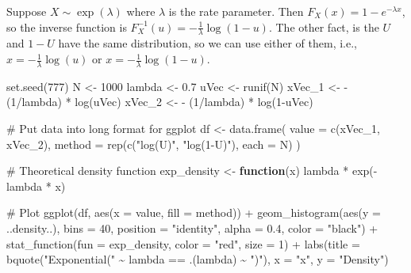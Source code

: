 \documentclass[
  letterpaper,
  DIV=11,
  numbers=noendperiod]{scrreprt}
\newenvironment{Shaded}{\begin{snugshade}}{\end{snugshade}}
\newcommand{\AttributeTok}[1]{\textcolor[rgb]{0.40,0.45,0.13}{#1}}
\newcommand{\CommentTok}[1]{\textcolor[rgb]{0.37,0.37,0.37}{#1}}
\newcommand{\ControlFlowTok}[1]{\textcolor[rgb]{0.00,0.23,0.31}{\textbf{#1}}}
\newcommand{\DecValTok}[1]{\textcolor[rgb]{0.68,0.00,0.00}{#1}}
\newcommand{\FloatTok}[1]{\textcolor[rgb]{0.68,0.00,0.00}{#1}}
\newcommand{\FunctionTok}[1]{\textcolor[rgb]{0.28,0.35,0.67}{#1}}
\newcommand{\NormalTok}[1]{\textcolor[rgb]{0.00,0.23,0.31}{#1}}
\newcommand{\OtherTok}[1]{\textcolor[rgb]{0.00,0.23,0.31}{#1}}
\newcommand{\SpecialCharTok}[1]{\textcolor[rgb]{0.37,0.37,0.37}{#1}}
\newcommand{\StringTok}[1]{\textcolor[rgb]{0.13,0.47,0.30}{#1}}
\begin{document}
Suppose \(X\sim \exp(\lambda)\) where \(\lambda\) is the rate parameter.
Then \(F_X(x) = 1 - e^{-\lambda x}\), so the inverse function is
\(F_X^{-1}(u) = -\frac{1}{\lambda}\log(1-u)\). The other fact, is the
\(U\) and \(1-U\) have the same distribution, so we can use either of
them, i.e., \(x= -\frac{1}{\lambda}\log(u)\) or
\(x= -\frac{1}{\lambda}\log(1-u)\).

\begin{Shaded}
\begin{Highlighting}[]
\FunctionTok{set.seed}\NormalTok{(}\DecValTok{777}\NormalTok{)}
\NormalTok{N }\OtherTok{\textless{}{-}} \DecValTok{1000}
\NormalTok{lambda }\OtherTok{\textless{}{-}} \FloatTok{0.7}
\NormalTok{uVec }\OtherTok{\textless{}{-}} \FunctionTok{runif}\NormalTok{(N)}
\NormalTok{xVec\_1 }\OtherTok{\textless{}{-}} \SpecialCharTok{{-}}\NormalTok{ (}\DecValTok{1}\SpecialCharTok{/}\NormalTok{lambda) }\SpecialCharTok{*} \FunctionTok{log}\NormalTok{(uVec)}
\NormalTok{xVec\_2 }\OtherTok{\textless{}{-}} \SpecialCharTok{{-}}\NormalTok{ (}\DecValTok{1}\SpecialCharTok{/}\NormalTok{lambda) }\SpecialCharTok{*} \FunctionTok{log}\NormalTok{(}\DecValTok{1}\SpecialCharTok{{-}}\NormalTok{uVec)}

\CommentTok{\# Put data into long format for ggplot}
\NormalTok{df }\OtherTok{\textless{}{-}} \FunctionTok{data.frame}\NormalTok{(}
  \AttributeTok{value =} \FunctionTok{c}\NormalTok{(xVec\_1, xVec\_2),}
  \AttributeTok{method =} \FunctionTok{rep}\NormalTok{(}\FunctionTok{c}\NormalTok{(}\StringTok{"log(U)"}\NormalTok{, }\StringTok{"log(1{-}U)"}\NormalTok{), }\AttributeTok{each =}\NormalTok{ N)}
\NormalTok{)}

\CommentTok{\# Theoretical density function}
\NormalTok{exp\_density }\OtherTok{\textless{}{-}} \ControlFlowTok{function}\NormalTok{(x) lambda }\SpecialCharTok{*} \FunctionTok{exp}\NormalTok{(}\SpecialCharTok{{-}}\NormalTok{lambda }\SpecialCharTok{*}\NormalTok{ x)}

\CommentTok{\# Plot}
\FunctionTok{ggplot}\NormalTok{(df, }\FunctionTok{aes}\NormalTok{(}\AttributeTok{x =}\NormalTok{ value, }\AttributeTok{fill =}\NormalTok{ method)) }\SpecialCharTok{+}
  \FunctionTok{geom\_histogram}\NormalTok{(}\FunctionTok{aes}\NormalTok{(}\AttributeTok{y =}\NormalTok{ ..density..), }\AttributeTok{bins =} \DecValTok{40}\NormalTok{,}
                 \AttributeTok{position =} \StringTok{"identity"}\NormalTok{, }\AttributeTok{alpha =} \FloatTok{0.4}\NormalTok{, }\AttributeTok{color =} \StringTok{"black"}\NormalTok{) }\SpecialCharTok{+}
  \FunctionTok{stat\_function}\NormalTok{(}\AttributeTok{fun =}\NormalTok{ exp\_density, }\AttributeTok{color =} \StringTok{"red"}\NormalTok{, }\AttributeTok{size =} \DecValTok{1}\NormalTok{) }\SpecialCharTok{+}
  \FunctionTok{labs}\NormalTok{(}\AttributeTok{title =} \FunctionTok{bquote}\NormalTok{(}\StringTok{"Exponential("} \SpecialCharTok{\textasciitilde{}}\NormalTok{ lambda }\SpecialCharTok{==}\NormalTok{ .(lambda) }\SpecialCharTok{\textasciitilde{}} \StringTok{")"}\NormalTok{),}
       \AttributeTok{x =} \StringTok{"x"}\NormalTok{, }\AttributeTok{y =} \StringTok{"Density"}\NormalTok{) }
\end{Highlighting}
\end{Shaded}
\end{document}

